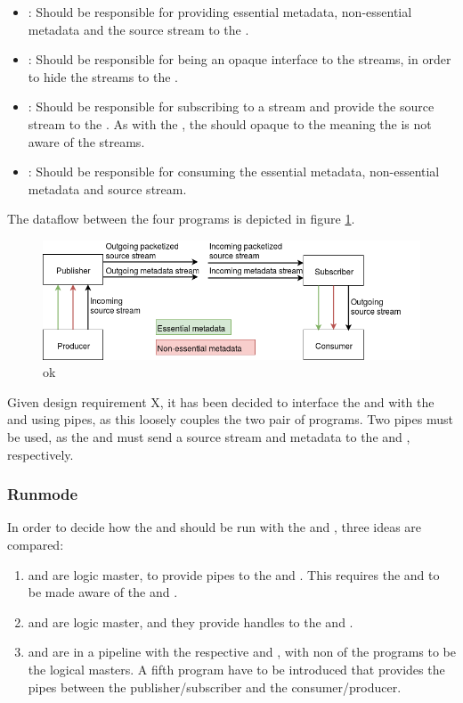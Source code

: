 \begin{itemize}
	\item \pro: Should be responsible for providing essential metadata, non-essential metadata and the source stream to the \pub.
	
	\item \pub: Should be responsible for being an opaque interface to the streams, in order to hide the streams to the \pro{}. 
	
	\item \sub{}: Should be responsible for subscribing to a stream and provide the source stream to the \con{}. As with the \pub{}, the \sub{} should opaque to the \con{} meaning the \con{} is not aware of the streams. 
	
	\item \con{}: Should be responsible for consuming the essential metadata, non-essential metadata and source stream.
\end{itemize}

The dataflow between the four programs is depicted in figure \ref{fig:design:pubsub}.
\begin{figure}[H]
	\centering
	\includegraphics[width=1\textwidth]{figures/publisher-subscriber}
	\caption{ok} \label{fig:design:pubsub}
\end{figure}


Given design requirement X, it has been decided to interface the \pubs and \subs with the \pros{} and \cons{} using pipes, as this loosely couples the two pair of programs. Two pipes must be used, as the \pros{} and \subs{} must send a source stream and metadata to the \pubs{} and \cons, respectively.

\subsubsection*{Runmode}
In order to decide how the \pubs{} and \subs{} should be run with the \pros{} and \cons{}, three ideas are compared:
\begin{enumerate}
	\item \cons{} and \pros{} are logic master, to provide pipes to the \pubs{} and \subs{}. This requires the \cons{} and \pros{} to be made aware of the \subs{} and \pubs{}. 
	\item \subs{} and \pubs{} are logic master, and they provide handles to the \cons{} and \subs{}.
	\item \subs{} and \pubs{} are in a pipeline with the respective \cons{} and \pros{}, with non of the programs to be the logical masters. A fifth program have to be introduced that provides the pipes between the publisher/subscriber and the consumer/producer.
\end{enumerate}

